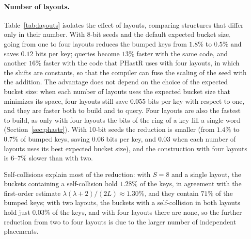 \documentclass[11pt]{article}
\newcommand{\PHastR}{PHastR\xspace}
\begin{document}
\paragraph{Number of layouts.}
Table~\ref{tab:layouts} isolates the effect of layouts, comparing
structures that differ only in their number. With 8-bit seeds and the
default expected bucket size, going from one to four layouts reduces the
bumped keys from $1.8\%$ to $0.5\%$ and saves $0.12$ bits per key; queries
become $13\%$ faster with the same code, and another $16\%$ faster with the
code that \PHastR uses with four layouts, in which the shifts are constants,
so that the compiler can fuse the scaling of the seed with the addition.
The advantage does not depend on the choice of the expected bucket size:
when each number of layouts uses the expected bucket size that minimizes its
space, four layouts still save $0.055$ bits per key with respect to one,
and they are faster both to build and to query. Four layouts are also the
fastest to build, as only with four layouts the bits of the ring of a key
fill a single word (Section~\ref{sec:phastr}). With 10-bit seeds the
reduction is smaller (from $1.4\%$ to $0.7\%$ of bumped keys, saving $0.06$
bits per key, and $0.03$ when each number of layouts uses its best expected
bucket size), and the construction with four layouts is $6$--$7\%$ slower
than with two.

Self-collisions explain most of the reduction: with $S=8$ and a single
layout, the buckets containing a self-collision hold $1.28\%$ of the keys, in
agreement with the first-order estimate $\lambda(\lambda+2)/(2L)\approx
1.30\%$, and they contain $71\%$ of the bumped keys; with two layouts, the
buckets with a self-collision in both layouts hold just $0.03\%$ of the keys,
and with four layouts there are none, so the further reduction from two to
four layouts is due to the larger number of independent placements.
\end{document}

